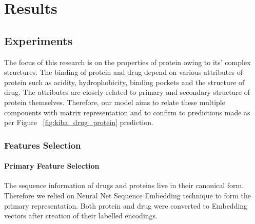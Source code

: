 \chapter{Results}


\section{Experiments}

The focus of this research is on the properties of protein owing to its' complex structures. The binding of protein and drug depend on various attributes of protein such as acidity, hydrophobicity, binding pockets and the structure of drug. The attributes are closely related to primary and secondary structure of protein themselves. Therefore, our model aims to relate these multiple components with matrix representation and to confirm to predictions made as per Figure ~\ref{fig:kiba_drug_protein} prediction.

\subsection{Features Selection}
\subsubsection{Primary Feature Selection}
The sequence information of drugs and proteins live in their canonical form. 
Therefore we relied on Neural Net Sequence Embedding technique to form the primary representation. Both protein and drug were converted to Embedding vectors after creation of their labelled encodings. 

